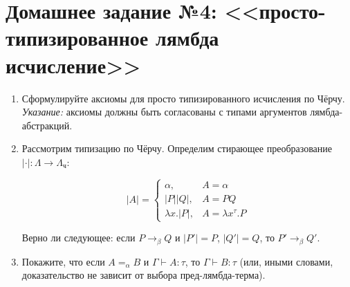 \documentclass[10pt,a4paper,oneside]{article}
\begin{document}
\section*{Домашнее задание №4: <<просто-типизированное лямбда исчисление>>}
\begin{enumerate}
\item Сформулируйте аксиомы для просто типизированного исчисления по Чёрчу. 
\emph{Указание:} аксиомы должны быть согласованы с типами аргументов
лямбда-абстракций.
\item Рассмотрим типизацию по Чёрчу. Определим стирающее преобразование $|\cdot|: \Lambda \rightarrow \Lambda_\textrm{ч}$:

$$|A| = \left\{ \begin{array}{ll} \alpha,& A = \alpha\\
                                  |P| |Q|,& A = P Q\\
                                  \lambda x.|P|,& A = \lambda x^\tau.P \end{array}  \right.$$

Верно ли следующее: если $P \rightarrow_\beta Q$ и $|P'|=P$, $|Q'|=Q$, то $P'\rightarrow_\beta Q'$.
\item Покажите, что если $A =_\alpha B$ и $\Gamma\vdash A:\tau$, то $\Gamma\vdash B:\tau$ (или, иными словами,
доказательство не зависит от выбора пред-лямбда-терма).
\end{enumerate}
\end{document}
